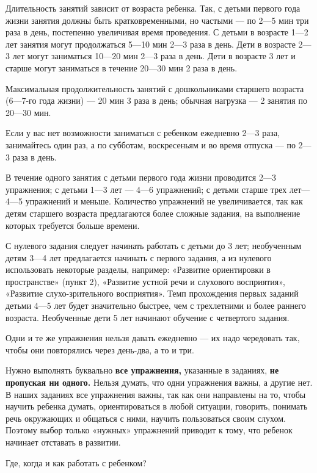 \documentclass{book}
\begin{document}
Длительность занятий зависит от возраста ребенка. Так, с детьми первого
года жизни занятия должны быть кратковременными, но частыми --- по 2---5
мин три раза в день, постепенно увеличивая время проведения. С детьми в
возрасте 1---2 лет занятия могут продолжаться 5---10 мин 2---3 раза в
день. Дети в возрасте 2---3 лет могут заниматься 10---20 мин 2---3 раза
в день. Дети в возрасте 3 лет и старше могут заниматься в течение
20---30 мин 2 раза в день.

Максимальная продолжительность занятий с дошкольниками старшего возраста
(6---7-го года жизни) --- 20 мин 3 раза в день; обычная нагрузка --- 2
занятия по 20---30 мин.

Если у вас нет возможности заниматься с ребенком ежедневно 2---3 раза,
занимайтесь один раз, а по субботам, воскресеньям и во время отпуска ---
по 2---3 раза в день.

В течение одного занятия с детьми первого года жизни проводится 2---3
упражнения; с детьми 1---3 лет --- 4---6 упражнений; с детьми старше
трех лет---4---5 упражнений и меньше. Количество упражнений не
увеличивается, так как детям старшего возраста предлагаются более
сложные задания, на выполнение которых требуется больше времени.

С нулевого задания следует начинать работать с детьми до 3 лет;
необученным детям 3---4 лет предлагается начинать с первого задания, а
из нулевого использовать некоторые разделы, например: «Развитие
ориентировки в пространстве» (пункт 2), «Развитие устной речи и
слухового восприятия», «Развитие слухо-зрительного восприятия». Темп
прохождения первых заданий детьми 4---5 лет будет значительно быстрее,
чем с трехлетними и более раннего возраста. Необученные дети 5 лет
начинают обучение с четвертого задания.

Одни и те же упражнения нельзя давать ежедневно --- их надо чередовать
так, чтобы они повторялись через день-два, а то и три.

Нужно выполнять буквально \textbf{все упражнения,} указанные в заданиях,
\textbf{не пропуская ни одного.} Нельзя думать, что одни упражнения
важны, а другие нет. В наших заданиях все упражнения важны, так как они
направлены на то, чтобы научить ребенка думать, ориентироваться в любой
ситуации, говорить, понимать речь окружающих и общаться с ними, научить
пользоваться своим слухом. Поэтому выбор только «нужных» упражнений
приводит к тому, что ребенок начинает отставать в развитии.

Где, когда и как работать с ребенком?
\end{document}
